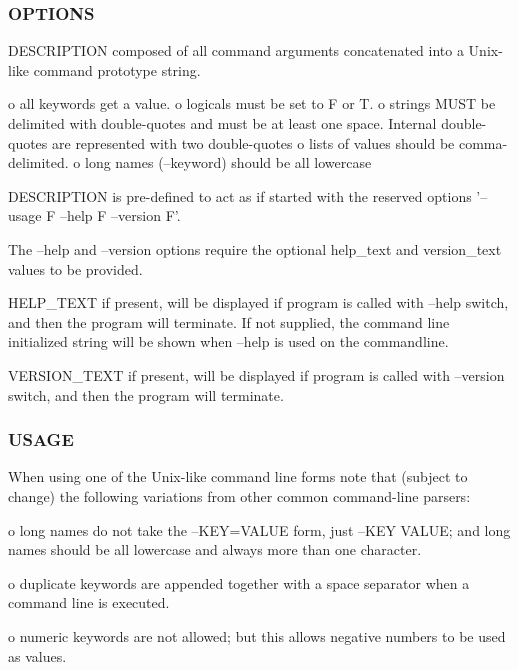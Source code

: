 \subsubsection*{O\+P\+T\+I\+O\+NS}

\begin{DoxyVerb}  DESCRIPTION   composed of all command arguments concatenated
                into a Unix-like command prototype string.

                o all keywords get a value.
                o logicals must be set to F or T.
                o strings MUST be delimited with double-quotes and
                  must be at least one space. Internal
                  double-quotes are represented with two double-quotes
                o lists of values should be comma-delimited.
                o long names (--keyword) should be all lowercase

                DESCRIPTION is pre-defined to act as if started with the
                reserved options '--usage F --help F --version F'.

                The --help and --version options require the optional
                help_text and version_text values to be provided.

  HELP_TEXT     if present, will be displayed if program is called with
                --help switch, and then the program will terminate. If
                not supplied, the command line initialized string will be
                shown when --help is used on the commandline.

  VERSION_TEXT  if present, will be displayed if program is called with
                --version switch, and then the program will terminate.
\end{DoxyVerb}


\subsubsection*{U\+S\+A\+GE}

When using one of the Unix-\/like command line forms note that (subject to change) the following variations from other common command-\/line parsers\+:

o long names do not take the --K\+EY=V\+A\+L\+UE form, just --K\+EY V\+A\+L\+UE; and long names should be all lowercase and always more than one character.

o duplicate keywords are appended together with a space separator when a command line is executed.

o numeric keywords are not allowed; but this allows negative numbers to be used as values.

